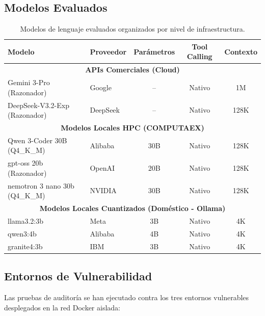 \subsection{Modelos Evaluados}

\begin{table}[H]
\centering
\renewcommand{\arraystretch}{1.2}
\small
\begin{tabular}{|l|l|c|c|c|}
\hline
\rowcolor[gray]{0.85}
\textbf{Modelo} & \textbf{Proveedor} & \textbf{Parámetros} & \textbf{Tool Calling} & \textbf{Contexto} \\
\hline
\multicolumn{5}{|c|}{\cellcolor{blue!10}\textbf{APIs Comerciales (Cloud)}} \\
\hline
Gemini 3-Pro (Razonador) & Google & -- & Nativo & 1M \\
\hline
DeepSeek-V3.2-Exp (Razonador) & DeepSeek & -- & Nativo & 128K \\
\hline
\multicolumn{5}{|c|}{\cellcolor{green!10}\textbf{Modelos Locales HPC (COMPUTAEX)}} \\
\hline
Qwen 3-Coder 30B (Q4\_K\_M) & Alibaba & 30B & Nativo & 128K \\
\hline
gpt-oss 20b (Razonador) & OpenAI & 20B & Nativo & 128K \\
\hline
nemotron 3 nano 30b (Q4\_K\_M) & NVIDIA & 30B & Nativo & 128K \\
\hline
\multicolumn{5}{|c|}{\cellcolor{orange!10}\textbf{Modelos Locales Cuantizados (Doméstico - Ollama)}} \\
\hline
llama3.2:3b & Meta & 3B & Nativo & 4K \\
\hline
qwen3:4b & Alibaba & 4B & Nativo & 4K \\
\hline
granite4:3b & IBM & 3B & Nativo & 4K \\
\hline
\end{tabular}
\caption{Modelos de lenguaje evaluados organizados por nivel de infraestructura.}
\label{tab:modelos_evaluados}
\end{table}

\subsection{Entornos de Vulnerabilidad}

Las pruebas de auditoría se han ejecutado contra los tres entornos vulnerables desplegados en la red Docker aislada:

